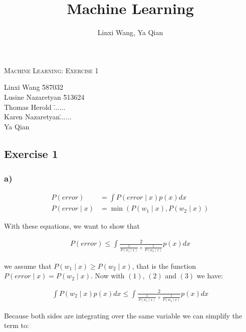 \documentclass[10pt,a4paper]{article}
\author{Linxi Wang, Ya Qian}
\title{Machine Learning}
\begin{document}
\begin{center}
\Large{\textsc{Machine Learning: Exercise 1}} \\
\end{center}

\begin{tabbing}
Linxi Wang \hspace{0.9cm}\= 587032\\
Lusine Nazaretyan \hspace{0.9cm}\= 513624\\
Thomas Herold \hspace{0.9cm}\= ......\\ 
Karen Nazaretyan\hspace{0.9cm}\= ......\\ 
Ya Qian

\end{tabbing}

\subsection*{Exercise 1}
\subsubsection*{a)}
\begin{align}
	P(error) &= \int P(error\mid x)p(x) dx \label{eq1} \\
	P(error\mid x) &= \min (P(w_1\mid x), P(w_2\mid x)) \label{eq2}
\end{align}

With these equations, we want to show that

\begin{align}
	P(error) \le \int \frac{2}{\frac{1}{P(w_1\mid x)} + \frac{1}{P(w_2 \mid x)}} p(x) dx \label{eq3}
\end{align}

we assume that $P(w_1 \mid x) \ge P(w_2 \mid x) \label{ass1}$, that is the function $P(error \mid x) = P(w_2 \mid x)$. Now with $(1)$, $(2)$ and $(3)$ we have:

\begin{align*}
	\int P(w_2 \mid x)p(x) dx \le \int \frac{2}{\frac{1}{P(w_1\mid x)} + \frac{1}{P(w_2 \mid x)}} p(x) dx
\end{align*}

Because both sides are integrating over the same variable we can simplify the term to:
\end{document}
